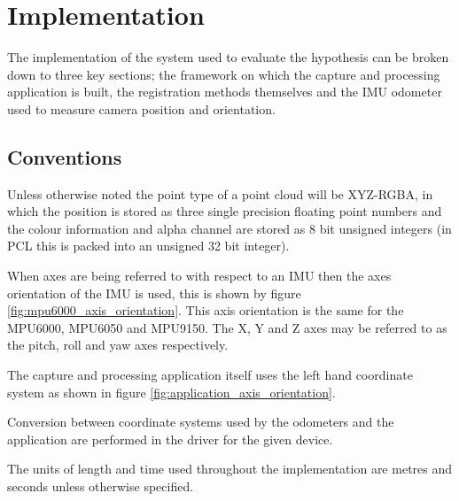 \documentclass{entcs}
\begin{document}
\section{Implementation}

The implementation of the system used to evaluate the hypothesis can be broken
down to three key sections; the framework on which the capture and processing
application is built, the registration methods themselves and the IMU odometer
used to measure camera position and orientation.

\subsection{Conventions}

Unless otherwise noted the point type of a point cloud will be XYZ-RGBA, in
which the position is stored as three single precision floating point numbers
and the colour information and alpha channel are stored as 8 bit unsigned
integers (in PCL this is packed into an unsigned 32 bit integer).

When axes are being referred to with respect to an IMU then the axes orientation
of the IMU is used, this is shown by figure \ref{fig:mpu6000_axis_orientation}.
This axis orientation is the same for the MPU6000, MPU6050 and MPU9150. The X, Y
and Z axes may be referred to as the pitch, roll and yaw axes respectively.

The capture and processing application itself uses the left hand coordinate
system as shown in figure \ref{fig:application_axis_orientation}.

Conversion between coordinate systems used by the odometers and the application
are performed in the driver for the given device.

The units of length and time used throughout the implementation are metres and
seconds unless otherwise specified.
\end{document}
